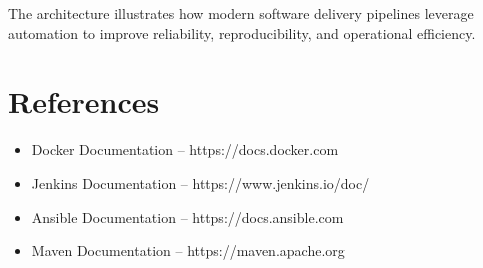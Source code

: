 \documentclass[12pt]{article}
\begin{document}
The architecture illustrates how modern software delivery pipelines 
leverage automation to improve reliability, reproducibility, and 
operational efficiency.
\section{References}

\begin{itemize}
\item Docker Documentation – https://docs.docker.com
\item Jenkins Documentation – https://www.jenkins.io/doc/
\item Ansible Documentation – https://docs.ansible.com
\item Maven Documentation – https://maven.apache.org
\end{itemize}
\end{document}
